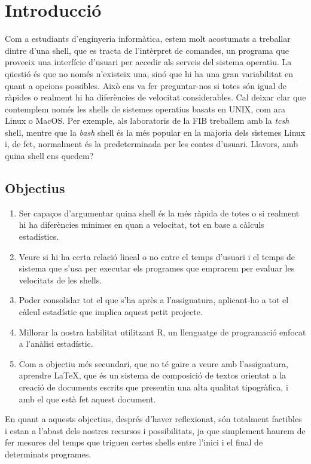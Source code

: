 \documentclass[12pt]{article}
\begin{document}
\newpage
\section{Introducció}
Com a estudiants d'enginyeria informàtica, estem molt acostumats a treballar dintre d'una shell,
que es tracta de l'intèrpret de comandes, un programa que proveeix una interfície d'usuari
per accedir als serveis del sistema operatiu. La qüestió és que no només n'existeix una, sinó
que hi ha una gran variabilitat en quant a opcions possibles. Això ens va fer preguntar-nos si 
totes són igual de ràpides o realment hi ha diferències de velocitat considerables. Cal deixar clar
que contemplem només les shells de sistemes operatius basats en UNIX, com ara Linux o MacOS. Per exemple,
als laboratoris de la FIB treballem amb la \textit{tcsh} shell, mentre que la \textit{bash} shell és 
la més popular en la majoria dels sistemes Linux i, de fet, normalment és la predeterminada per 
les contes d'usuari. Llavors, amb quina shell ens quedem?


\subsection{Objectius}
\begin{enumerate}
  \item Ser capaços d'argumentar quina shell és la més ràpida de totes o si realment hi ha diferències 
    mínimes en quan a velocitat, tot en base a càlculs estadístics.
  \item Veure si hi ha certa relació lineal o no entre el temps d'usuari i el temps de sistema que s'usa
    per executar els programes que emprarem per evaluar les velocitats de les shells.
  \item Poder consolidar tot el que s'ha après a l'assignatura, aplicant-ho a tot el càlcul estadístic
    que implica aquest petit projecte.
  \item Millorar la nostra habilitat utilitzant R, un llenguatge de programació enfocat a l'anàlisi
    estadístic.
  \item Com a objectiu més secundari, que no té gaire a veure amb l'assignatura, aprendre \LaTeX, que 
    és un sistema de composició de textos orientat a la creació de documents escrits que presentin una
    alta qualitat tipogràfica, i amb el que està fet aquest document.

\end{enumerate}

En quant a aquests objectius, després d'haver reflexionat, són totalment factibles i estan a l'abast
dels nostres recursos i possibilitats, ja que simplement haurem de fer mesures del temps que triguen
certes shells entre l'inici i el final de determinats programes.
\newpage
\end{document}
